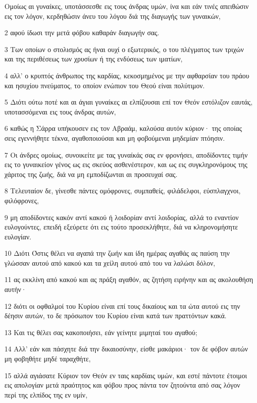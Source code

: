 \par Ομοίως αι γυναίκες, υποτάσσεσθε εις τους άνδρας υμών, ίνα και εάν τινές απειθώσιν εις τον λόγον, κερδηθώσιν άνευ του λόγου διά της διαγωγής των γυναικών,
\par 2 αφού ίδωσι την μετά φόβου καθαράν διαγωγήν σας.
\par 3 Των οποίων ο στολισμός ας ήναι ουχί ο εξωτερικός, ο του πλέγματος των τριχών και της περιθέσεως των χρυσίων ή της ενδύσεως των ιματίων,
\par 4 αλλ' ο κρυπτός άνθρωπος της καρδίας, κεκοσμημένος με την αφθαρσίαν του πράου και ησυχίου πνεύματος, το οποίον ενώπιον του Θεού είναι πολύτιμον.
\par 5 Διότι ούτω ποτέ και αι άγιαι γυναίκες αι ελπίζουσαι επί τον Θεόν εστόλιζον εαυτάς, υποτασσόμεναι εις τους άνδρας αυτών,
\par 6 καθώς η Σάρρα υπήκουσεν εις τον Αβραάμ, καλούσα αυτόν κύριον· της οποίας σεις εγεννήθητε τέκνα, αγαθοποιούσαι και μη φοβούμεναι μηδεμίαν πτόησιν.
\par 7 Οι άνδρες ομοίως, συνοικείτε με τας γυναίκάς σας εν φρονήσει, αποδίδοντες τιμήν εις το γυναικείον γένος ως εις σκεύος ασθενέστερον, και ως εις συγκληρονόμους της χάριτος της ζωής, διά να μη εμποδίζωνται αι προσευχαί σας.
\par 8 Τελευταίον δε, γίνεσθε πάντες ομόφρονες, συμπαθείς, φιλάδελφοι, εύσπλαγχνοι, φιλόφρονες,
\par 9 μη αποδίδοντες κακόν αντί κακού ή λοιδορίαν αντί λοιδορίας, αλλά το εναντίον ευλογούντες, επειδή εξεύρετε ότι εις τούτο προσεκλήθητε, διά να κληρονομήσητε ευλογίαν.
\par 10 Διότι Όστις θέλει να αγαπά την ζωήν και ίδη ημέρας αγαθάς ας παύση την γλώσσαν αυτού από κακού και τα χείλη αυτού από του να λαλώσι δόλον,
\par 11 ας εκκλίνη από κακού και ας πράξη αγαθόν, ας ζητήση ειρήνην και ας ακολουθήση αυτήν·
\par 12 διότι οι οφθαλμοί του Κυρίου είναι επί τους δικαίους και τα ώτα αυτού εις την δέησιν αυτών, το δε πρόσωπον του Κυρίου είναι κατά των πραττόντων κακά.
\par 13 Και τις θέλει σας κακοποιήσει, εάν γείνητε μιμηταί του αγαθού;
\par 14 Αλλ' εάν και πάσχητε διά την δικαιοσύνην, είσθε μακάριοι· τον δε φόβον αυτών μη φοβηθήτε μηδέ ταραχθήτε,
\par 15 αλλά αγιάσατε Κύριον τον Θεόν εν ταις καρδίαις υμών, και εστέ πάντοτε έτοιμοι εις απολογίαν μετά πραότητος και φόβου προς πάντα τον ζητούντα από σας λόγον περί της ελπίδος της εν υμίν,
